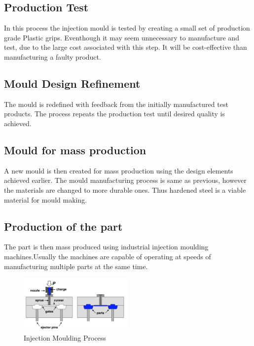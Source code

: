 \documentclass[12pt,a4paper,oneside]{article}
\begin{document}
\subsection{Production Test}

In this process the injection mould is tested by creating a small set of production grade Plastic grips. Eventhough it may seem unnecessary to manufacture and test, due to the large cost associated with this step. It will be cost-effective than manufacturing a faulty product.

\subsection{Mould Design Refinement}

The mould is redefined with feedback from the initially manufactured test products. The process repeats the production test until desired quality is achieved.

\subsection{Mould for mass production}

A new mould is then created for mass production using the design elements achieved earlier. The mould manufacturing process is same as previous, however the materials are changed to more durable ones. Thus hardened steel is a viable material for mould making. 
\cite{2018:Injection}


\subsection{Production of the part}

The part is then mass produced using industrial injection moulding machines.Usually the machines are capable of operating at speeds of manufacturing multiple parts at the same time.  

\begin{figure}[H]
\includegraphics[width=0.5\textwidth]{injection-moulding}
\caption{Injection Moulding Process\cite{2018:InjectionImage}}
\end{figure}
\end{document}
